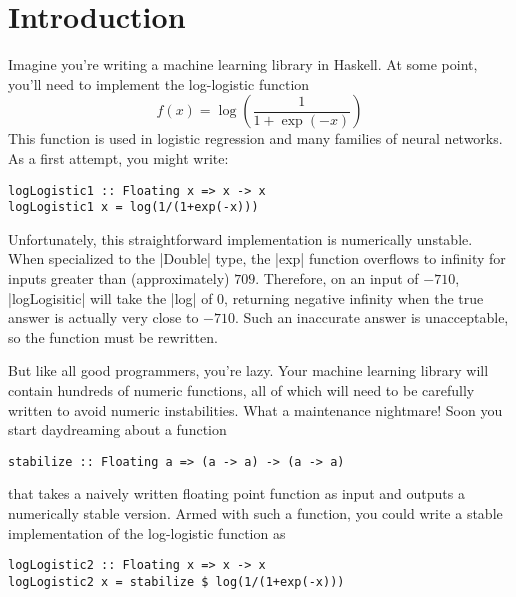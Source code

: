 \documentclass[preprint]{sigplanconf}
\theoremstyle{definition}
\begin{document}



\section{Introduction}

Imagine you're writing a machine learning library in Haskell.
At some point, you'll need to implement the log-logistic function
\begin{equation}
f(x) = \log\left(\frac{1}{1+\exp{(-x)}}\right)
\label{eq:log-logistic}
\end{equation}
This function is used in logistic regression and many families of neural networks.
As a first attempt, you might write:
\begin{lstlisting}
logLogistic1 :: Floating x => x -> x
logLogistic1 x = log(1/(1+exp(-x)))
\end{lstlisting}
Unfortunately, this straightforward implementation is numerically unstable.
When specialized to the |Double| type,
the |exp| function overflows to infinity for inputs greater than (approximately) $709$.
Therefore, on an input of $-710$,
|logLogisitic| will take the |log| of 0,
returning negative infinity when the true answer is actually very close to $-710$.
Such an inaccurate answer is unacceptable,
so the function must be rewritten.

But like all good programmers, you're lazy.
Your machine learning library will contain hundreds of numeric functions,
all of which will need to be carefully written to avoid numeric instabilities.
What a maintenance nightmare!
Soon you start daydreaming about a function
\begin{lstlisting}
stabilize :: Floating a => (a -> a) -> (a -> a)
\end{lstlisting}
that takes a naively written floating point function as input and outputs a numerically stable version.
Armed with such a function, you could write a stable implementation of the log-logistic function as
\begin{lstlisting}
logLogistic2 :: Floating x => x -> x
logLogistic2 x = stabilize $ log(1/(1+exp(-x)))
\end{lstlisting}
\end{document}
